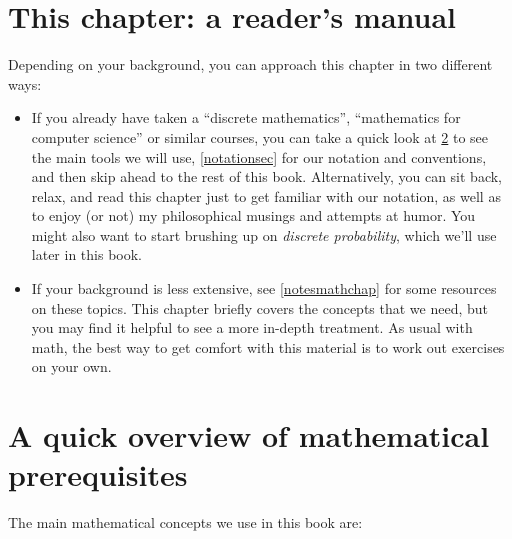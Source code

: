 \section{This chapter: a reader's manual}\label{manualbackground}

Depending on your background, you can approach this chapter in two
different ways:

\begin{itemize}
\item
  If you already have taken a ``discrete mathematics'', ``mathematics
  for computer science'' or similar courses, you can take a quick look
  at \cref{secmathoverview} to see the main tools we will use,
  \cref{notationsec} for our notation and conventions, and then skip
  ahead to the rest of this book. Alternatively, you can sit back,
  relax, and read this chapter just to get familiar with our notation,
  as well as to enjoy (or not) my philosophical musings and attempts at
  humor. You might also want to start brushing up on \emph{discrete
  probability}, which we'll use later in this book.
\item
  If your background is less extensive, see \cref{notesmathchap} for
  some resources on these topics. This chapter briefly covers the
  concepts that we need, but you may find it helpful to see a more
  in-depth treatment. As usual with math, the best way to get comfort
  with this material is to work out exercises on your own.
\end{itemize}

\section{A quick overview of mathematical
prerequisites}\label{secmathoverview}

The main mathematical concepts we use in this book are:


